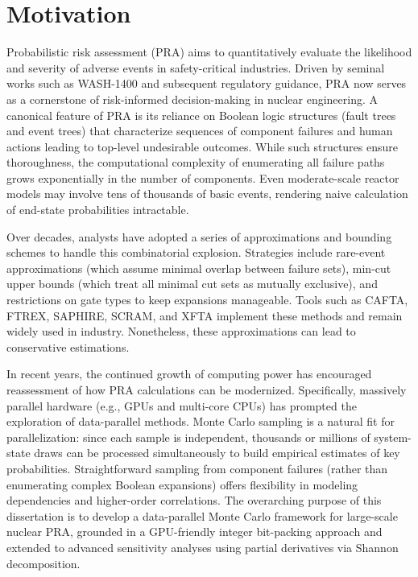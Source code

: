 \section{Motivation}
Probabilistic risk assessment (PRA) aims to quantitatively evaluate the likelihood and severity of adverse events in safety-critical industries. Driven by seminal works such as WASH-1400 and subsequent regulatory guidance, PRA now serves as a cornerstone of risk-informed decision-making in nuclear engineering. A canonical feature of PRA is its reliance on  Boolean logic structures (fault trees and event trees) that characterize sequences of component failures and human actions leading to top-level undesirable outcomes. While such structures ensure thoroughness, the computational complexity of enumerating all failure paths grows exponentially in the number of components. Even moderate-scale reactor models may involve tens of thousands of basic events, rendering naive calculation of end-state probabilities intractable.

Over decades, analysts have adopted a series of approximations and bounding schemes to handle this combinatorial explosion. Strategies include rare-event approximations (which assume minimal overlap between failure sets), min-cut upper bounds (which treat all minimal cut sets as mutually exclusive), and restrictions on gate types to keep expansions manageable. Tools such as CAFTA, FTREX, SAPHIRE, SCRAM, and XFTA implement these methods and remain widely used in industry. Nonetheless, these approximations can lead to conservative estimations.

In recent years, the continued growth of computing power has encouraged reassessment of how PRA calculations can be modernized. Specifically, massively parallel hardware (e.g., GPUs and multi-core CPUs) has prompted the exploration of data-parallel methods. Monte Carlo sampling is a natural fit for parallelization: since each sample is independent, thousands or millions of system-state draws can be processed simultaneously to build empirical estimates of key probabilities. Straightforward sampling from component failures (rather than enumerating complex Boolean expansions) offers flexibility in modeling dependencies and higher-order correlations. The overarching purpose of this dissertation is to develop a data-parallel Monte Carlo framework for large-scale nuclear PRA, grounded in a GPU-friendly integer bit-packing approach and extended to advanced sensitivity analyses using partial derivatives via Shannon decomposition.

